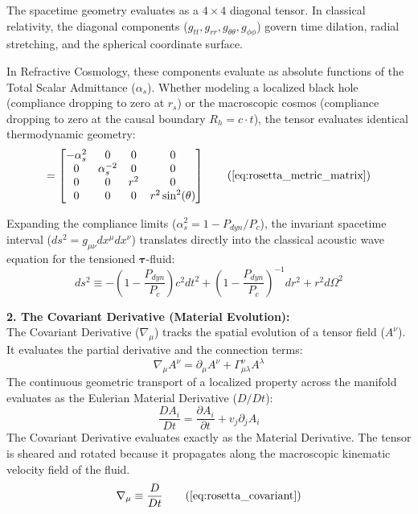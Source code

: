 \documentclass[11pt, a4paper]{article}
\begin{document}
The spacetime geometry evaluates as a $4 \times 4$ diagonal tensor. In classical relativity, the diagonal components ($g_{tt}, g_{rr}, g_{\theta\theta}, g_{\phi\phi}$) govern time dilation, radial stretching, and the spherical coordinate surface. 

In Refractive Cosmology, these components evaluate as absolute functions of the Total Scalar Admittance ($\alpha_s$). Whether modeling a localized black hole (compliance dropping to zero at $r_s$) or the macroscopic cosmos (compliance dropping to zero at the causal boundary $R_h = c \cdot t$), the tensor evaluates identical thermodynamic geometry:
\begin{equation}
    [\boldsymbol{g}_{\mu\nu}] = \begin{bmatrix}
    -\alpha_s^2 & 0 & 0 & 0 \\
    0 & \alpha_s^{-2} & 0 & 0 \\
    0 & 0 & r^2 & 0 \\
    0 & 0 & 0 & r^2 \sin^2(\theta)
    \end{bmatrix} \tag{\ref{eq:rosetta_metric_matrix}}
\end{equation}

Expanding the compliance limits ($\alpha_s^2 = 1 - P_{dyn}/P_c$), the invariant spacetime interval ($ds^2 = g_{\mu\nu} dx^\mu dx^\nu$) translates directly into the classical acoustic wave equation for the tensioned $\boldsymbol{\tau}$-fluid:
\begin{equation}
    ds^2 \equiv -\left( 1 - \frac{P_{dyn}}{P_c} \right) c^2 dt^2 + \left( 1 - \frac{P_{dyn}}{P_c} \right)^{-1} dr^2 + r^2 d\Omega^2 \label{eq:rosetta_acoustic_metric}
\end{equation}

\textbf{2. The Covariant Derivative (Material Evolution):} \\
The Covariant Derivative ($\nabla_\mu$) tracks the spatial evolution of a tensor field ($A^\nu$). It evaluates the partial derivative and the connection terms:
\begin{equation}
    \nabla_\mu A^\nu = \partial_\mu A^\nu + \Gamma^\nu_{\mu\lambda} A^\lambda 
\end{equation}
The continuous geometric transport of a localized property across the manifold evaluates as the Eulerian Material Derivative ($D/Dt$):
\begin{equation}
    \frac{D A_i}{Dt} = \frac{\partial A_i}{\partial t} + v_j \partial_j A_i 
\end{equation}
The Covariant Derivative evaluates exactly as the Material Derivative. The tensor is sheared and rotated because it propagates along the macroscopic kinematic velocity field of the fluid.
\begin{equation}
    \nabla_\mu \equiv \frac{D}{Dt} \tag{\ref{eq:rosetta_covariant}}
\end{equation}
\end{document}
